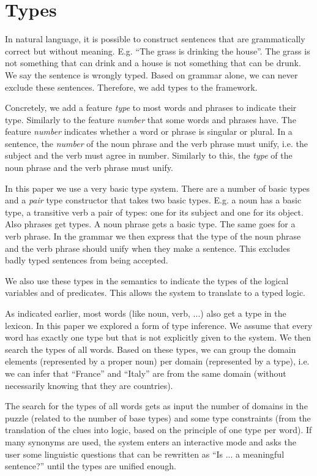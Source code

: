 \section{Types}
\label{sec:types}
In natural language, it is possible to construct sentences that are grammatically correct but without meaning. E.g. ``The grass is drinking the house''. The grass is not something that can drink and a house is not something that can be drunk. We say the sentence is wrongly typed. Based on grammar alone, we can never exclude these sentences. Therefore, we add types to the framework.

Concretely, we add a feature \textit{type} to most words and phrases to indicate their type. Similarly to the feature \textit{number} that some words and phrases have. The feature \textit{number} indicates whether a word or phrase is singular or plural. In a sentence, the \textit{number} of the noun phrase and the verb phrase must unify, i.e. the subject and the verb must agree in number. Similarly to this, the \textit{type} of the noun phrase and the verb phrase must unify.

In this paper we use a very basic type system. There are a number of basic types and a \textit{pair} type constructor that takes two basic types. E.g. a noun has a basic type, a transitive verb a pair of types: one for its subject and one for its object. Also phrases get types. A noun phrase gets a basic type. The same goes for a verb phrase. In the grammar we then express that the type of the noun phrase and the verb phrase should unify when they make a sentence. This excludes badly typed sentences from being accepted.

We also use these types in the semantics to indicate the types of the logical variables and of predicates. This allows the system to translate to a typed logic.

As indicated earlier, most words (like noun, verb, ...) also get a type in the lexicon. In this paper we explored a form of type inference. We assume that every word has exactly one type but that is not explicitly given to the system. We then search the types of all words. Based on these types, we can group the domain elements (represented by a proper noun) per domain (represented by a type), i.e. we can infer that ``France'' and ``Italy'' are from the same domain (without necessarily knowing that they are countries).

The search for the types of all words gets as input the number of domains in the puzzle (related to the number of base types) and some type constraints (from the translation of the clues into logic, based on the principle of one type per word). If many synonyms are used, the system enters an interactive mode and asks the user some linguistic questions that can be rewritten as ``Is ... a meaningful sentence?'' until the types are unified enough.

